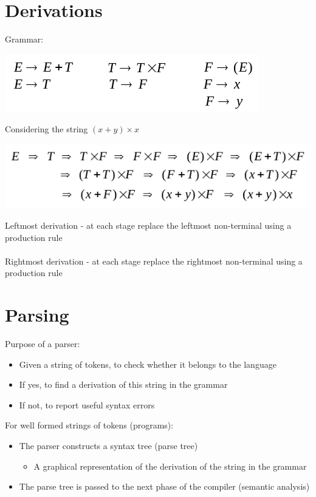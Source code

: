 \documentclass{article}[18pt]
\begin{document}
\section{Derivations}
Grammar:
\begin{center}
	\includegraphics[scale=0.7]{Grammar}
\end{center}
Considering the string $(x+y)\times x$
\begin{center}
	\includegraphics[scale=0.7]{Derivation}
\end{center}
Leftmost derivation - at each stage replace the leftmost non-terminal using a production rule\\
\\
Rightmost derivation - at each stage replace the rightmost non-terminal using a production rule
\section{Parsing}
Purpose of a parser:
\begin{itemize}
	\item Given a string of tokens, to check whether it belongs to the language
	\item If yes, to find a derivation of this string in the grammar
	\item If not, to report useful syntax errors 
\end{itemize}
For well formed strings of tokens (programs):
\begin{itemize}
	\item The parser constructs a syntax tree (parse tree)
	\begin{itemize}
		\item A graphical representation of the derivation of the string in the grammar
	\end{itemize}
	\item The parse tree is passed to the next phase of the compiler (semantic analysis)
\end{itemize}
\end{document}
